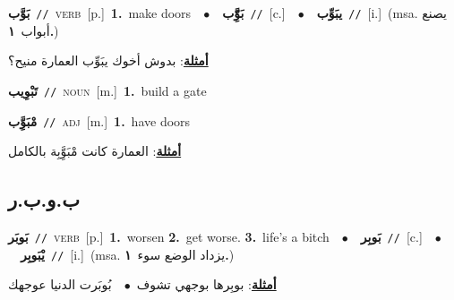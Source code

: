 \documentclass[10pt,a4paper,twoside]{article} %
\begin{document}
\begin{multicols}{2}
{\setlength\topsep{0pt}\textbf{\foreignlanguage{arabic}{بَوَّب}}\ {\color{gray}\texttt{//}\color{black}}\ \textsc{verb}\ [p.]\ \textbf{1.}~make doors\ \ $\bullet$\ \ \setlength\topsep{0pt}\textbf{\foreignlanguage{arabic}{بَوَِّّب}}\ {\color{gray}\texttt{//}\color{black}}\ [c.]\ \ $\bullet$\ \ \setlength\topsep{0pt}\textbf{\foreignlanguage{arabic}{يبَوِّب}}\ {\color{gray}\texttt{//}\color{black}}\ [i.]\ \color{gray}(msa. \foreignlanguage{arabic}{يصنع أبواب}~\foreignlanguage{arabic}{\textbf{١.}})\color{black}\  \begin{flushright}\color{gray}\foreignlanguage{arabic}{\textbf{\underline{\foreignlanguage{arabic}{أمثلة}}}: بدوش أخوك يبَوِّب العمارة منيح؟}\end{flushright}\color{black}} \vspace{2mm}

{\setlength\topsep{0pt}\textbf{\foreignlanguage{arabic}{تَبْوِيب}}\ {\color{gray}\texttt{//}\color{black}}\ \textsc{noun}\ [m.]\ \textbf{1.}~build a gate\ } \vspace{2mm}

{\setlength\topsep{0pt}\textbf{\foreignlanguage{arabic}{مْبَوَِّب}}\ {\color{gray}\texttt{//}\color{black}}\ \textsc{adj}\ [m.]\ \textbf{1.}~have doors\  \begin{flushright}\color{gray}\foreignlanguage{arabic}{\textbf{\underline{\foreignlanguage{arabic}{أمثلة}}}: العمارة كانت مْبَوَِّبِة بالكامل}\end{flushright}\color{black}} \vspace{2mm}

\vspace{-3mm}
\subsection*{\color{blue}\foreignlanguage{arabic}{ب.و.ب.ر}\color{blue}{}} 

{\setlength\topsep{0pt}\textbf{\foreignlanguage{arabic}{بَوبَر}}\ {\color{gray}\texttt{//}\color{black}}\ \textsc{verb}\ [p.]\ \textbf{1.}~worsen  \textbf{2.}~get worse.  \textbf{3.}~life's a bitch\ \ $\bullet$\ \ \setlength\topsep{0pt}\textbf{\foreignlanguage{arabic}{بَوبِر}}\ {\color{gray}\texttt{//}\color{black}}\ [c.]\ \ $\bullet$\ \ \setlength\topsep{0pt}\textbf{\foreignlanguage{arabic}{يْبَوبِر}}\ {\color{gray}\texttt{//}\color{black}}\ [i.]\ \color{gray}(msa. \foreignlanguage{arabic}{يزداد الوضع سوء}~\foreignlanguage{arabic}{\textbf{١.}})\color{black}\  \begin{flushright}\color{gray}\foreignlanguage{arabic}{\textbf{\underline{\foreignlanguage{arabic}{أمثلة}}}: بوبِرها بوجهي تشوف\ $\bullet$\ \  بُوبَرت الدنيا عوجهك}\end{flushright}\color{black}} \vspace{2mm}


\end{multicols}
\end{document}
